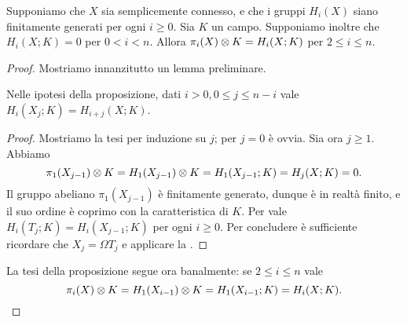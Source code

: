 \begin{proposition}
Supponiamo che $X$ sia semplicemente connesso, e che i gruppi $H_i(X)$ siano finitamente generati per ogni $i\ge 0$. Sia $K$ un campo. Supponiamo inoltre che $H_i(X;K)=0$ per $0<i<n$. Allora $\pi_i(X)\mathbin{\otimes} K=H_i(X;K)$ per $2\le i\le n$.
\end{proposition}
\begin{proof}
Mostriamo innanzitutto un lemma preliminare.
\begin{lemma*}
Nelle ipotesi della proposizione, dati $i>0,0\le j\le n-i$ vale $H_i(X_j;K)=H_{i+j}(X;K)$.
\end{lemma*}
\begin{proof}
Mostriamo la tesi per induzione su $j$; per $j=0$ è ovvia. Sia ora $j\ge 1$. Abbiamo 
$$
\pi_1(X_{j-1})\mathbin{\otimes} K=H_1(X_{j-1})\mathbin{\otimes} K=H_1(X_{j-1};K)=H_j(X;K)=0.
$$
Il gruppo abeliano $\pi_1(X_{j-1})$ è finitamente generato, dunque è in realtà finito, e il suo ordine è coprimo con la caratteristica di $K$. Per \missing{} vale $H_i(T_j;K)=H_i(X_{j-1};K)$ per ogni $i\ge 0$. Per concludere è sufficiente ricordare che $X_j=\Omega T_j$ e applicare la .
\end{proof}
La tesi della proposizione segue ora banalmente: se $2\le i\le n$ vale
$$
\pi_i(X)\mathbin{\otimes} K=H_1(X_{i-1})\mathbin{\otimes} K=H_1(X_{i-1};K)=H_i(X;K).
$$
\end{proof}

